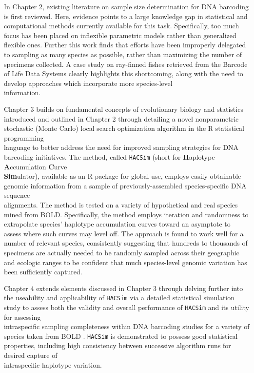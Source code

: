 In Chapter 2, existing literature on sample size determination for DNA barcoding is first reviewed. Here, evidence points to a large knowledge gap in statistical and computational methods currently available for this task. Specifically, too much focus has been placed on inflexible parametric models rather than generalized flexible ones. Further this work finds that efforts have been improperly delegated to sampling as many species as possible, rather than maximizing the number of specimens collected. A case study on ray-finned fishes retrieved from the Barcode of Life Data Systems \cite{ratnasingham2007bold} clearly highlights this shortcoming, along with the need to develop approaches which incorporate more species-level \\ information. 
 



Chapter 3 builds on fundamental concepts of evolutionary biology and statistics \\ introduced and outlined in Chapter 2 through detailing a novel nonparametric stochastic (Monte Carlo) local search optimization algorithm in the R statistical programming \\ language to better address the need for improved sampling strategies for DNA barcoding initiatives. The method, called {\tt HACSim} (short for \textbf{H}aplotype \textbf{A}ccumulation \textbf{C}urve \\ \textbf{Sim}ulator), available as an R package for global use, employs easily obtainable genomic information from a sample of previously-assembled species-specific DNA sequence \\ alignments.  The method is tested on a variety of hypothetical and real species mined from BOLD. Specifically, the method employs iteration and randomness to extrapolate  species' haplotype accumulation curves toward an asymptote to assess where such curves may level off. The approach is found to work well for a number of relevant species, consistently suggesting that hundreds to thousands of specimens are actually needed to be randomly sampled across their geographic and ecologic ranges to be confident that much species-level genomic variation has been sufficiently captured.  




Chapter 4 extends elements discussed in Chapter 3 through delving further into the useability and applicability of {\tt HACSim} via a detailed statistical simulation study to assess both the validity and overall performance of {\tt HACSim} and its utility for assessing \\ intraspecific sampling completeness within DNA barcoding studies for a variety of species taken from BOLD \cite{ratnasingham2007bold}. {\tt HACSim} is demonstrated to possess good statistical properties, including high consistency between successive algorithm runs for desired capture of \\ intraspecific haplotype variation.



